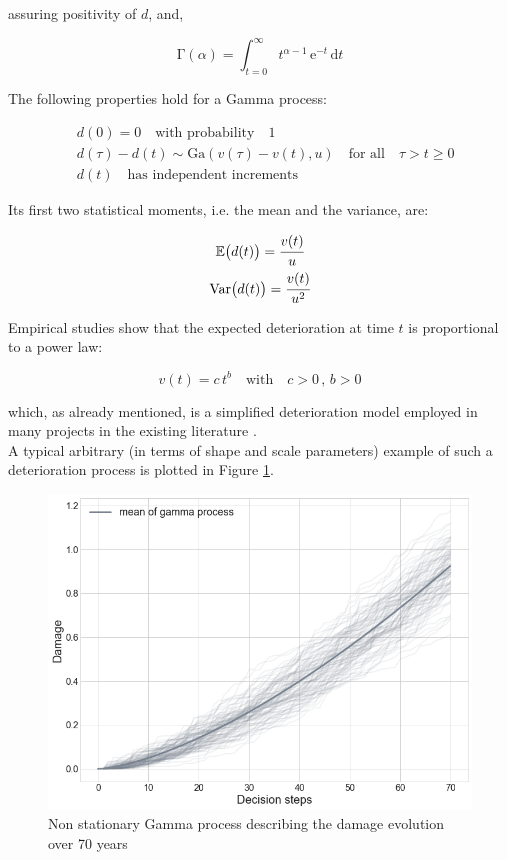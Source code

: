 assuring positivity of $d$, and,

$$ \mathrm{\Gamma}(\alpha) = \int ^{\infty}_{t=0} t^{\alpha -1}\, \mathrm{e}^{-t}\, \mathrm{d}t $$

The following properties hold for a Gamma process:

\begin{align*}
    &d(0) = 0 \quad \text{with probability} \quad 1\\
    &d(\tau) - d(t) \sim \mathrm{Ga}(v(\tau)-v(t), u) \quad \text{for all} \quad \tau > t \geq 0\\
    &d(t) \quad \text{has independent increments}
\end{align*}

Its first two statistical moments, i.e. the mean and the variance, are:

\begin{gather*}
    \mathbb{E}\big ( d(t) \big ) = \cfrac{v(t)}{u}\\
    \mathrm{Var} \big ( d(t) \big ) = \cfrac{v(t)}{u^2}
\end{gather*}

Empirical studies show that the expected deterioration at time $t$ is proportional to a power law:

\begin{equation}
    v(t) = c\,t^b \quad \text{with} \quad c > 0 \, , \, b > 0
\end{equation}

which, as already mentioned, is a simplified deterioration model employed in many projects in the existing literature \cite{kamariotis2022value}.\\

A typical arbitrary (in terms of shape and scale parameters) example of such a deterioration process is plotted in Figure \ref{gamma}.

\begin{figure}[H]
    \centering
	\includegraphics[width=0.7\linewidth]{Figures/gamma.png}
	\caption{Non stationary Gamma process describing the damage evolution over 70 years}
	\label{gamma}
\end{figure}


